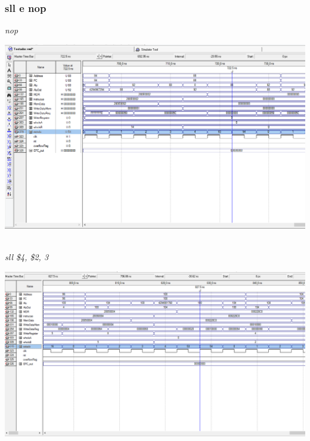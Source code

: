 \documentclass{article}
\begin{document}
    \\    
    \subsubsection{sll e nop}
    {\it nop}\\
    \begin{center}
        \includegraphics[scale=0.25]{nop.PNG}
    \end{center}
    \\
    {\it sll \$4, \$2, 3}\\
    \begin{center}
        \includegraphics[scale=0.25]{sll.PNG}
    \end{center}
    
    \newpage
\end{document}
